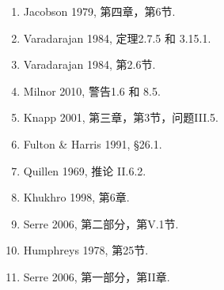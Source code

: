 \begin{enumerate}
\item Jacobson 1979, 第四章，第6节.  
\item Varadarajan 1984, 定理2.7.5 和 3.15.1.  
\item Varadarajan 1984, 第2.6节.  
\item Milnor 2010, 警告1.6 和 8.5.  
\item Knapp 2001, 第三章，第3节，问题III.5.
\item Fulton & Harris 1991, §26.1.  
\item Quillen 1969, 推论 II.6.2.  
\item Khukhro 1998, 第6章.  
\item Serre 2006, 第二部分，第V.1节.  
\item Humphreys 1978, 第25节.  
\item Serre 2006, 第一部分，第II章.
\end{enumerate}
